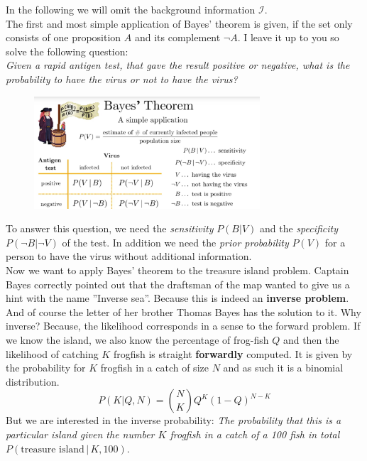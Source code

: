 \documentclass[12pt, a4paper]{scrartcl}
\begin{document}
In the following we will omit the background information $\mathcal{I}$.\\

The first and most simple application of Bayes’ theorem is given, if the set
only consists of one proposition $A$ and its complement $\lnot A$. I leave it up to
you so solve the following question:\\

\textit{Given a rapid antigen test, that gave the result positive or negative,
what is the probability to have the virus or not to have the virus?}
 \begin{figure}[H]
	\centering
	\includegraphics[width=0.75\textwidth]{6_1.png}
\end{figure}
To answer this question, we need the \textit{sensitivity} $P(B|V)$ and the \textit{specificity} $P(\lnot B|\lnot V)$ of the test.
In addition we need the \textit{prior probability} $P(V)$ for a person to have the virus
without additional information.\\

Now we want to apply Bayes’ theorem to the treasure island problem. Captain Bayes 
correctly pointed out that the draftsman of the map wanted to
give us a hint with the name ”Inverse sea”. Because this is indeed an \textbf{inverse problem}. And of course the letter of her brother Thomas Bayes has
the solution to it.
Why inverse? Because, the likelihood corresponds in a sense to the forward
problem. If we know the island, we also know the percentage of frog-fish $Q$
and then the likelihood of catching $K$ frogfish is straight \textbf{forwardly}
computed. It is given by the probability for $K$ frogfish in a catch of size $N$
and as such it is a binomial distribution. \[P(K|Q,N)={N\choose K}Q^K(1-Q)^{N-K}\]
But we are interested in the inverse probability: \textit{The probability that this is
a particular island given the number $K$ frogfish in a catch of a 100 fish in
total} $P(\text{treasure island}\, |\,K, 100)$.\\
\end{document}
